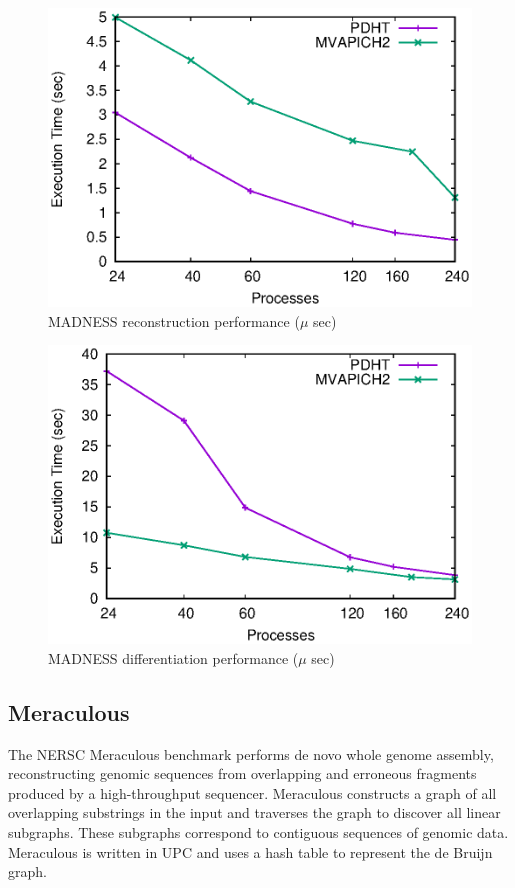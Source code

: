 \begin{figure}
  \centering
  \includegraphics[width=.9\linewidth]{plots/reconstruct}
  \caption{MADNESS reconstruction performance ($\mu$ sec)}
  \label{fig:mad-reconstruct}
\end{figure}


\begin{figure}
  \centering
  \includegraphics[width=.9\linewidth]{plots/diff}
  \caption{MADNESS differentiation performance ($\mu$ sec)}
  \label{fig:mad-diff}
\end{figure}

\subsection{Meraculous}

The NERSC Meraculous benchmark performs de novo whole genome assembly,
reconstructing genomic sequences from overlapping and erroneous fragments
produced by a high-throughput sequencer. Meraculous constructs a graph of all
overlapping substrings in the input and traverses the graph to discover all
linear subgraphs. These subgraphs correspond to contiguous sequences of
genomic data. Meraculous is written in UPC and uses a hash table
to represent the de Bruijn graph. 

